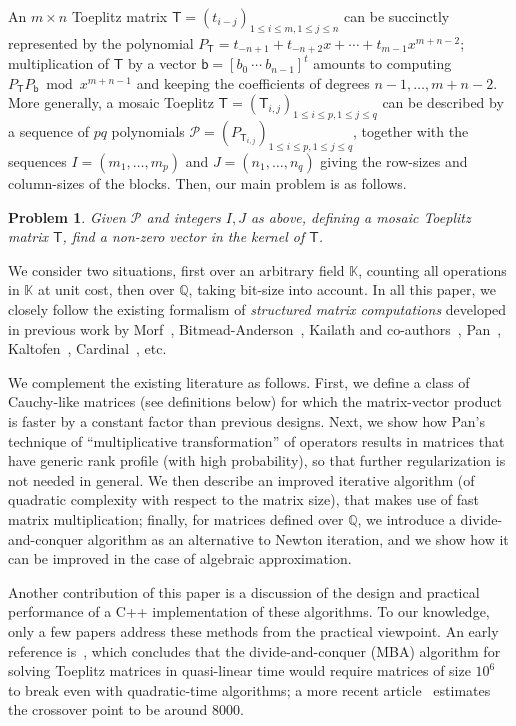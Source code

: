 \documentclass[sigconf]{acmart}
\newcommand{\vb}{\ensuremath{\mathsf{b}}}
\newcommand{\mT}{\ensuremath{\mathsf{T}}}
\newcommand{\K}{\ensuremath{\mathbb{K}}}
\newcommand{\Q}{\ensuremath{\mathbb{Q}}}
\renewcommand{\P}{\ensuremath{\mathscr{P}}}
\newtheorem{pbm}{Problem}
\theoremstyle{acmdefinition}
\begin{document}
An $m \times n$ Toeplitz matrix
$\mT=(t_{i-j})_{1\le i \le m, 1 \le j \le n}$ can be succinctly
represented by the polynomial
$P_\mT=t_{-n+1} + t_{-n+2} x + \cdots + t_{m-1} x^{m+n-2}$;
multiplication of $\mT$ by a vector $\vb=[b_0~\cdots~b_{n-1}]^t$
amounts to computing $P_\mT P_\vb \bmod x^{m+n-1}$ and keeping the
coefficients of degrees $n-1,\dots,m+n-2$.  More generally, a mosaic
Toeplitz $\mT=(\mT_{i,j})_{1 \le i \le p,1 \le j \le q}$ can be
described by a sequence of $pq$  polynomials
$\P=(P_{\mT_{i,j}})_{1 \le i \le p,1 \le j \le q}$, together
with the sequences $I=(m_1,\dots,m_p)$ and $J=(n_1,\dots,n_q)$ giving
the row-sizes and column-sizes of the blocks. Then, our main
problem is as follows.
%
\vspace{-5px}
\begin{pbm}\label{pb:mosaic}
  Given $\P$ and integers $I,J$ as above, 
  defining a mosaic Toeplitz matrix $\mT$, find a non-zero
  vector in the kernel of $\mT$.
\end{pbm}
\vspace{-5px}
%
We consider two situations, first over an arbitrary field $\K$,
counting all operations in $\K$ at unit cost, then over $\Q$, taking
bit-size into account. In all this paper, we closely follow the
existing formalism of {\em structured matrix computations} developed
in previous work by Morf~\cite{Morf80},
Bitmead-Anderson~\cite{BiAn80}, Kailath and
co-authors~\cite{KaKuMo79,KaSa99}, Pan~\cite{Pan90,Pan92},
Kaltofen~\cite{Kaltofen94}, Cardinal~\cite{Cardinal99}, etc.

We complement the existing literature as follows. First, we define a
class of Cauchy-like matrices (see definitions below) for which
the matrix-vector product is faster by a constant factor than previous
designs. Next, we show how Pan's technique of ``multiplicative
transformation'' of operators results in matrices that have generic
rank profile (with high probability), so that further regularization
is not needed in general. We then describe an improved iterative
algorithm (of quadratic complexity with respect to the matrix size),
that makes use of fast matrix multiplication; finally, for matrices
defined over $\Q$, we introduce a divide-and-conquer algorithm as an
alternative to Newton iteration, and we show how it can be improved in
the case of algebraic approximation.

Another contribution of this paper is a discussion of the design and
practical performance of a C++ implementation of these algorithms.  To
our knowledge, only a few papers address these methods from the
practical viewpoint. An early reference is~\cite{SeShSp82}, which
concludes that the divide-and-conquer (MBA) algorithm for solving
Toeplitz matrices in quasi-linear time would require matrices of size
$10^6$ to break even with quadratic-time algorithms; a more recent
article~\cite{Huckle94} estimates the crossover point to be around
$8000$. 
\end{document}
